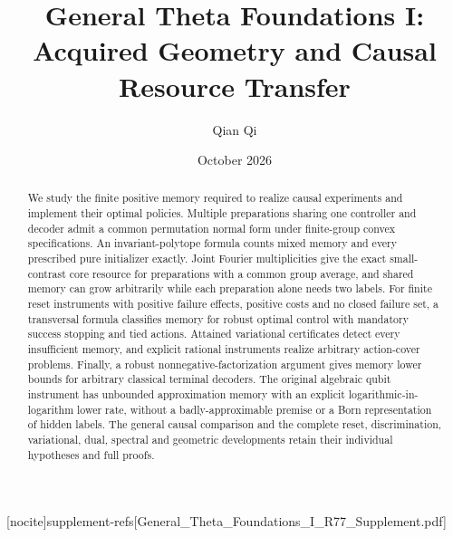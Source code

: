
[nocite]{supplement-refs}[General_Theta_Foundations_I_R77_Supplement.pdf]
\title[Acquired geometry and causal resource transfer]{General Theta Foundations I:\\Acquired Geometry and Causal Resource Transfer}
\author{Qian Qi}\date{October 2026}

\begin{abstract}
We study the finite positive memory required to realize causal experiments
and implement their optimal policies.  Multiple preparations sharing one
controller and decoder admit a common permutation normal form under
finite-group convex specifications.  An invariant-polytope formula counts
mixed memory and every prescribed pure initializer exactly.  Joint Fourier
multiplicities give the exact small-contrast core resource for preparations
with a common group average, and shared memory can grow arbitrarily while
each preparation alone needs two labels.  For finite reset instruments
with positive failure effects, positive costs and no closed failure set,
a transversal formula classifies memory for robust optimal control with
mandatory success stopping and tied actions.  Attained variational
certificates detect every insufficient memory, and explicit rational
instruments realize arbitrary action-cover problems.  Finally, a robust
nonnegative-factorization argument gives memory lower bounds for arbitrary
classical terminal decoders.  The original algebraic qubit instrument has
unbounded approximation memory with an explicit logarithmic-in-logarithm
lower rate, without a badly-approximable premise or a Born representation
of hidden labels.  The general causal comparison and the complete reset,
discrimination, variational, dual, spectral and geometric developments
retain their individual hypotheses and full proofs.
\end{abstract}
\maketitle











